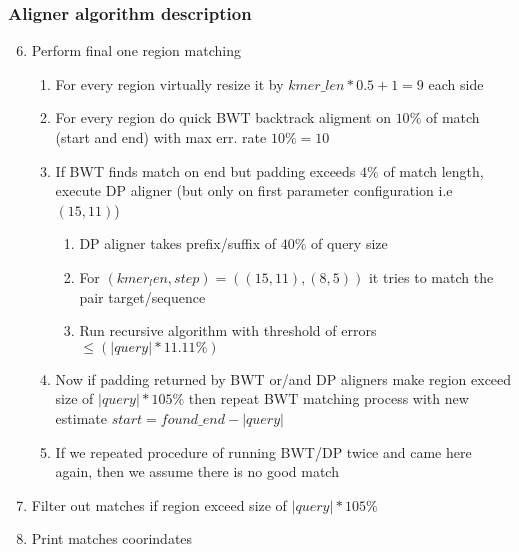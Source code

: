 \begin{frame}
  \frametitle{Aligner algorithm description}
  \scriptsize
  \begin{enumerate}
    \setcounter{enumi}{5}
    \item Perform final one region matching
    \begin{enumerate}
      \scriptsize
      \item For every region virtually resize it by $kmer\_len*0.5+1 = 9$ each side
      \item For every region do quick BWT backtrack aligment on $10\%$ of match (start and end) with max err. rate $10\%=10$
      \item If BWT finds match on end but padding exceeds $4\%$ of match length, execute DP aligner (but only on first parameter configuration i.e $(15, 11)$)
      \begin{enumerate}
        \scriptsize
        \item DP aligner takes prefix/suffix of $40\%$ of query size
        \item For $(kmer_len, step) = ((15, 11), (8, 5))$ it tries to match the pair target/sequence
        \item Run recursive algorithm with threshold of errors $\leq (|query| * 11.11\%)$
      \end{enumerate}
      \item Now if padding returned by BWT or/and DP aligners make region exceed size of $|query|*105\%$ then repeat BWT matching process with new estimate $start = found\_end - |query|$
      \item If we repeated procedure of running BWT/DP twice and came here again, then we assume there is no good match
    \end{enumerate}
    \item Filter out matches if region exceed size of $|query|*105\%$
    \item Print matches coorindates
  \end{enumerate}

\end{frame}

